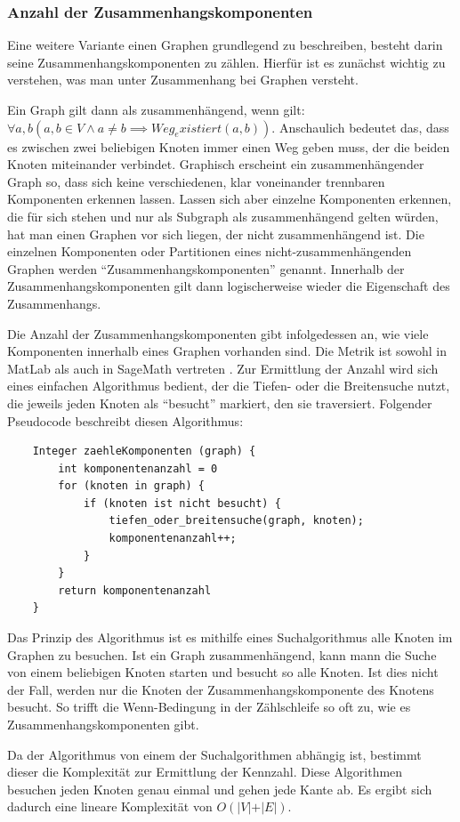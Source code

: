 \documentclass[a4paper,12pt,ngerman,chapterprefix=false,listof=totoc,bibliography=totoc]{scrreprt}
\begin{document}
\subsubsection*{Anzahl der Zusammenhangskomponenten}
{
Eine weitere Variante einen Graphen grundlegend zu beschreiben, besteht darin seine Zusammenhangskomponenten zu zählen. Hierfür ist es zunächst wichtig zu verstehen, was man unter Zusammenhang bei Graphen versteht.

Ein Graph gilt dann als zusammenhängend, wenn gilt: \(\forall a, b(a,b\in V \land a\neq b \implies Weg_existiert(a, b))\). Anschaulich bedeutet das, dass es zwischen zwei beliebigen Knoten immer einen Weg geben muss, der die beiden Knoten miteinander verbindet. Graphisch erscheint ein zusammenhängender Graph so, dass sich keine verschiedenen, klar voneinander trennbaren Komponenten erkennen lassen. Lassen sich aber einzelne Komponenten erkennen, die für sich stehen und nur als Subgraph als zusammenhängend gelten würden, hat man einen Graphen vor sich liegen, der nicht zusammenhängend ist. Die einzelnen Komponenten oder Partitionen eines nicht-zusammenhängenden Graphen werden "`Zusammenhangskomponenten"' genannt. Innerhalb der Zusammenhangskomponenten gilt dann logischerweise wieder die Eigenschaft des Zusammenhangs. \cite{diestel_graphentheorie_2000}

Die Anzahl der Zusammenhangskomponenten gibt infolgedessen an, wie viele Komponenten innerhalb eines Graphen vorhanden sind. Die Metrik ist sowohl in MatLab als auch in SageMath vertreten \cite{sagemath_graph_2020,matlab_graph_2020}. Zur Ermittlung der Anzahl wird sich eines einfachen Algorithmus bedient, der die Tiefen- oder die Breitensuche nutzt, die jeweils jeden Knoten als "`besucht"' markiert, den sie traversiert. Folgender Pseudocode beschreibt diesen Algorithmus:
\begin{lstlisting}
	Integer zaehleKomponenten (graph) {
		int komponentenanzahl = 0
		for (knoten in graph) {
			if (knoten ist nicht besucht) {
				tiefen_oder_breitensuche(graph, knoten);
				komponentenanzahl++;
			}
		}
		return komponentenanzahl
	}
\end{lstlisting}
Das Prinzip des Algorithmus ist es mithilfe eines Suchalgorithmus alle Knoten im Graphen zu besuchen. Ist ein Graph zusammenhängend, kann mann die Suche von einem beliebigen Knoten starten und besucht so alle Knoten. Ist dies nicht der Fall, werden nur die Knoten der Zusammenhangskomponente des Knotens besucht. So trifft die Wenn-Bedingung in der Zählschleife so oft zu, wie es Zusammenhangskomponenten gibt.

Da der Algorithmus von einem der Suchalgorithmen abhängig ist, bestimmt dieser die Komplexität zur Ermittlung der Kennzahl. Diese Algorithmen besuchen jeden Knoten genau einmal und gehen jede Kante ab. Es ergibt sich dadurch eine lineare Komplexität von \(O(\vert V\vert +\vert E\vert)\).
}
\end{document}
